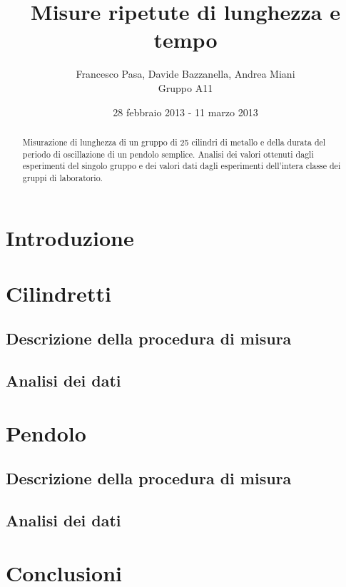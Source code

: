 \documentclass[12pt, twoside, a4paper]{article}
\begin{document}
\title{Misure ripetute di lunghezza e tempo}
\author{Francesco Pasa, Davide Bazzanella, Andrea Miani\\
Gruppo A11}
\date{28 febbraio 2013 - 11 marzo 2013}
\maketitle

\begin{abstract}
Misurazione di lunghezza di un gruppo di 25 cilindri di metallo e della durata del periodo di oscillazione di un pendolo semplice.
Analisi dei valori ottenuti dagli esperimenti del singolo gruppo e dei valori dati dagli esperimenti dell'intera classe dei gruppi di laboratorio.

\end{abstract}

\section{Introduzione}

\section{Cilindretti}
\subsection{Descrizione della procedura di misura}

\subsection{Analisi dei dati}

\section{Pendolo}
\subsection{Descrizione della procedura di misura}

\subsection{Analisi dei dati}

\section{Conclusioni}
\end{document}
